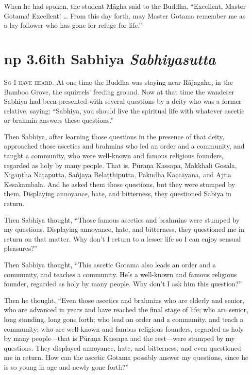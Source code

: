 \documentclass[12pt,openany]{book}%
\newcommand*{\suttatitleacronym}[1]{\smaller[2]{#1}\vspace*{.3em}}
\newcommand*{\suttatitletranslation}[1]{\linebreak{#1}}
\newcommand*{\suttatitleroot}[1]{\linebreak\smaller[2]\itshape{#1}}
\newcommand*{\tocacronym}[1]{\hspace*{-3.3em}{#1}\quad}
\newcommand*{\toctranslation}[1]{#1}
\newcommand*{\tocroot}[1]{(\textit{#1})}
\newcommand*{\scevam}[1]{\textsc{#1}}
\begin{document}
When he had spoken, the student \textsanskrit{Māgha} said to the Buddha, “Excellent, Master Gotama! Excellent! … From this day forth, may Master Gotama remember me as a lay follower who has gone for refuge for life.” 

%
\section*{{\suttatitleacronym Snp 3.6}{\suttatitletranslation With Sabhiya }{\suttatitleroot Sabhiyasutta}}
\addcontentsline{toc}{section}{\tocacronym{Snp 3.6} \toctranslation{With Sabhiya } \tocroot{Sabhiyasutta}}

\scevam{So I have heard. }At one time the Buddha was staying near \textsanskrit{Rājagaha}, in the Bamboo Grove, the squirrels’ feeding ground. Now at that time the wanderer Sabhiya had been presented with several questions by a deity who was a former relative, saying: “Sabhiya, you should live the spiritual life with whatever ascetic or brahmin answers these questions.” 

Then Sabhiya, after learning those questions in the presence of that deity, approached those ascetics and brahmins who led an order and a community, and taught a community, who were well-known and famous religious founders, regarded as holy by many people. That is, \textsanskrit{Pūraṇa} Kassapa, Makkhali \textsanskrit{Gosāla}, \textsanskrit{Nigaṇṭha} \textsanskrit{Nāṭaputta}, \textsanskrit{Sañjaya} \textsanskrit{Belaṭṭhiputta}, Pakudha \textsanskrit{Kaccāyana}, and Ajita Kesakambala. And he asked them those questions, but they were stumped by them. Displaying annoyance, hate, and bitterness, they questioned Sabiya in return. 

Then Sabhiya thought, “Those famous ascetics and brahmins were stumped by my questions. Displaying annoyance, hate, and bitterness, they questioned me in return on that matter. Why don’t I return to a lesser life so I can enjoy sensual pleasures?” 

Then Sabhiya thought, “This ascetic Gotama also leads an order and a community, and teaches a community. He’s a well-known and famous religious founder, regarded as holy by many people. Why don’t I ask him this question?” 

Then he thought, “Even those ascetics and brahmins who are elderly and senior, who are advanced in years and have reached the final stage of life; who are senior, long standing, long gone forth; who lead an order and a community, and teach a community; who are well-known and famous religious founders, regarded as holy by many people—that is \textsanskrit{Pūraṇa} Kassapa and the rest—were stumped by my questions. They displayed annoyance, hate, and bitterness, and even questioned me in return. How can the ascetic Gotama possibly answer my questions, since he is so young in age and newly gone forth?” 
\end{document}
